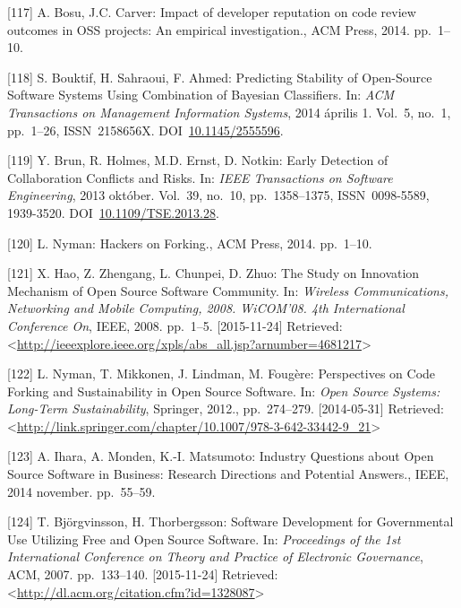 \documentclass[12pt,magyar,a4paper,oneside]{scrreprt}
\begin{document}
\leavevmode\hypertarget{ref-bosu_impact_2014}{}%
{[}117{]} A. Bosu, J.C. Carver: Impact of developer reputation on code
review outcomes in OSS projects: An empirical investigation., ACM Press,
2014. pp.~1--10.

\leavevmode\hypertarget{ref-bouktif_predicting_2014}{}%
{[}118{]} S. Bouktif, H. Sahraoui, F. Ahmed: Predicting Stability of
Open-Source Software Systems Using Combination of Bayesian Classifiers.
In: \emph{ACM Transactions on Management Information Systems}, 2014
április 1. Vol.~5, no.~1, pp.~1--26, ISSN~2158656X.
DOI~\href{https://doi.org/10.1145/2555596}{10.1145/2555596}.

\leavevmode\hypertarget{ref-brun_early_2013}{}%
{[}119{]} Y. Brun, R. Holmes, M.D. Ernst, D. Notkin: Early Detection of
Collaboration Conflicts and Risks. In: \emph{IEEE Transactions on
Software Engineering}, 2013 október. Vol.~39, no.~10, pp.~1358--1375,
ISSN~0098-5589, 1939-3520.
DOI~\href{https://doi.org/10.1109/TSE.2013.28}{10.1109/TSE.2013.28}.

\leavevmode\hypertarget{ref-nyman_hackers_2014}{}%
{[}120{]} L. Nyman: Hackers on Forking., ACM Press, 2014. pp.~1--10.

\leavevmode\hypertarget{ref-hao_study_2008}{}%
{[}121{]} X. Hao, Z. Zhengang, L. Chunpei, D. Zhuo: The Study on
Innovation Mechanism of Open Source Software Community. In:
\emph{Wireless Communications, Networking and Mobile Computing, 2008.
WiCOM'08. 4th International Conference On}, IEEE, 2008. pp.~1--5.
{[}2015-11-24{]} Retrieved:
\textless{}\url{http://ieeexplore.ieee.org/xpls/abs_all.jsp?arnumber=4681217}\textgreater{}

\leavevmode\hypertarget{ref-nyman_perspectives_2012}{}%
{[}122{]} L. Nyman, T. Mikkonen, J. Lindman, M. Fougère: Perspectives on
Code Forking and Sustainability in Open Source Software. In: \emph{Open
Source Systems: Long-Term Sustainability}, Springer, 2012.,
pp.~274--279. {[}2014-05-31{]} Retrieved:
\textless{}\url{http://link.springer.com/chapter/10.1007/978-3-642-33442-9_21}\textgreater{}

\leavevmode\hypertarget{ref-ihara_industry_2014}{}%
{[}123{]} A. Ihara, A. Monden, K.-I. Matsumoto: Industry Questions about
Open Source Software in Business: Research Directions and Potential
Answers., IEEE, 2014 november. pp.~55--59.

\leavevmode\hypertarget{ref-bjorgvinsson_software_2007}{}%
{[}124{]} T. Björgvinsson, H. Thorbergsson: Software Development for
Governmental Use Utilizing Free and Open Source Software. In:
\emph{Proceedings of the 1st International Conference on Theory and
Practice of Electronic Governance}, ACM, 2007. pp.~133--140.
{[}2015-11-24{]} Retrieved:
\textless{}\url{http://dl.acm.org/citation.cfm?id=1328087}\textgreater{}
\end{document}
